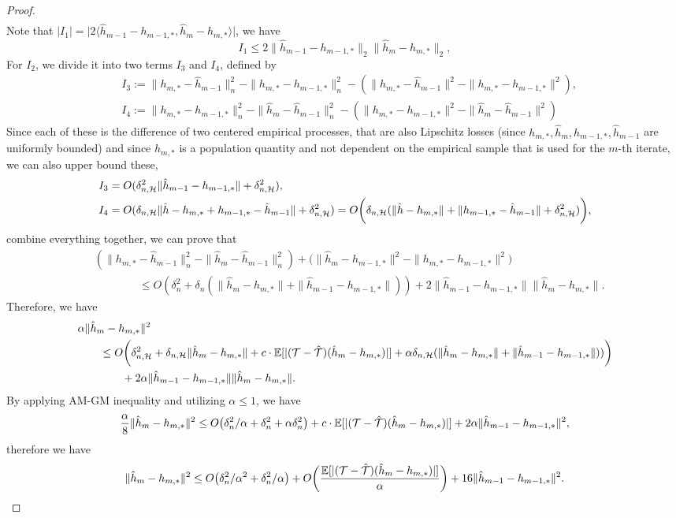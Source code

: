 \begin{proof}
\begin{align*}
\end{align*}
Note that $|I_1| = \big|2\langle \hat{h}_{m-1}- h_{m-1,*}, \hat{h}_{m}- h_{m,*} \rangle\big| $, we have $$
I_1 \leq 2\|\hat{h}_{m-1}- h_{m-1,*}\|_2 \|\hat{h}_{m}- h_{m,*}\|_2,
$$
For $I_2$, we divide it into two terms $I_3$ and $I_4$, defined by \begin{align*}
    &I_3 := \|h_{m,*} - \hat{h}_{m-1}\|_{n}^2 - \|h_{m,*} - h_{m-1,*}\|_n^2 - (\|h_{m,*} - \hat{h}_{m-1}\|^2 - \|h_{m,*} - h_{m-1,*}\|^2),\\
    &I_4 := \|h_{m,*} - h_{m-1,*}\|_n^2 - \|\hat{h}_{m} - \hat{h}_{m-1}\|_n^2 -(\|h_{m,*} - h_{m-1,*}\|^2 - \|\hat{h}_{m} - \hat{h}_{m-1}\|^2)
\end{align*}
Since each of these is the difference of two centered empirical processes, that are also Lipschitz losses (since
$h_{m,*}, \hat{h}_m, h_{m-1,*}, \hat{h}_{m-1}$ are uniformly bounded) and since $h_{m,*}$ is a population quantity and not dependent on the empirical sample that is used for the $m$-th iterate, we can also upper bound these,
\begin{align*}
    &I_3 = O(\delta_{n,\mathcal{H}}^2 \|\hat{h}_{m-1} - h_{m-1,*}\|+ \delta_{n,\mathcal{H}}^2),\\
    &I_4 = O(\delta_{n,\mathcal{H}}\|\hat{h} - h_{m,*} + h_{m-1,*} - \hat{h}_{m-1}\| +\delta_{n,\mathcal{H}}^2) = O\bigg(\delta_{n,\mathcal{H}}(\|\hat{h} - h_{m,*}\|+ \|h_{m-1,*} - \hat{h}_{m-1}\|+ \delta_{n,\mathcal{H}}^2)\bigg),
\end{align*}
combine everything together,  we can prove that  \begin{align*}
&(\|h_{m,*} - \hat{h}_{m-1}\|^2_n - \|\hat{h}_{m} - \hat{h}_{m-1}\|^2_n) +\big(\|\hat{h}_{m} - h_{m-1,*}\|^2 - \|h_{m,*} - h_{m-1,*}\|^2\big)\\
&\qquad\qquad\leq O(\delta_n^2 + \delta_n(\|\hat{h}_{m} - h_{m,*}\| + \|\hat{h}_{m-1} - h_{m-1,*}\|)) + 2\|\hat{h}_{m-1} - h_{m-1,*}\|\|\hat{h}_{m} - h_{m,*}\|.
\end{align*}
Therefore, we have \begin{align*}
    &\alpha \|\hat{h}_{m} - h_{m,*}\|^2 \\
    &\qquad\leq O\bigg(\delta_{n,\mathcal{H}}^2 + \delta_{n,\mathcal{H}}\|\hat{h}_{m} - h_{m,*}\| + c \cdot \mathbb{E}[|({\mathcal{T}} - \hat{{\mathcal{T}}})(\hat{h}_{m} - h_{m,*})|] + \alpha\delta_{n,\mathcal{H}}(\|\hat{h}_{m} - h_{m,*}\| + \|\hat{h}_{m-1} - h_{m-1,*}\|))\bigg)\\
    &\qquad\qquad + 2\alpha\|\hat{h}_{m-1} - h_{m-1,*}\|\|\hat{h}_{m} - h_{m,*}\|.
\end{align*}
By applying AM-GM inequality and utilizing $\alpha\leq 1$, we have $$
\frac{\alpha}{8}\|\hat{h}_{m} - h_{m,*}\|^2 \leq O\big(\delta_n^2/\alpha + \delta_n^2 
+\alpha\delta_n^2\big) + c \cdot \mathbb{E}[|({\mathcal{T}} - \hat{{\mathcal{T}}})(\hat{h}_{m} - h_{m,*})|] + 2\alpha\|\hat{h}_{m-1} - h_{m-1,*}\|^2,
\label{eqn:strong-iterated}$$
therefore we have $$
\|\hat{h}_{m} - h_{m,*}\|^2 \leq O\big(\delta_n^2/\alpha^2 + \delta_n^2 /\alpha
\big) + O\bigg(\frac{ \mathbb{E}[|({\mathcal{T}} - \hat{{\mathcal{T}}})(\hat{h}_{m} - h_{m,*})|]}{\alpha}\bigg)+ 16\|\hat{h}_{m-1} - h_{m-1,*}\|^2.
$$

\end{proof}
